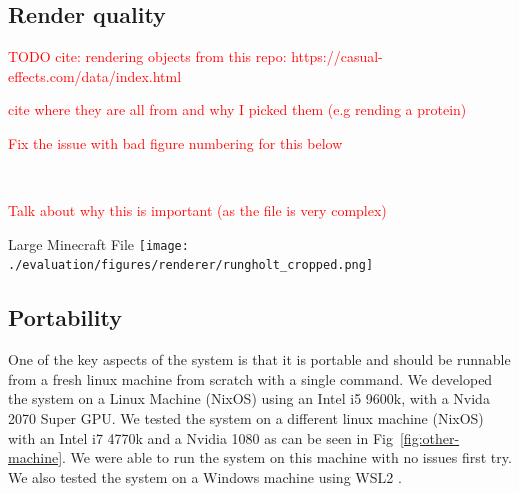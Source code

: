 \subsection[short]{Render quality}
\textcolor{red}{TODO cite: rendering objects from this repo: https://casual-effects.com/data/index.html}


\textcolor{red}{cite where they are all from and why I picked them (e.g rending a protein)}

\textcolor{red}{Fix the issue with bad figure numbering for this below}
\begin{invisBox}  
	\hfill
	\\[0.3cm]
	\hfill
\end{invisBox}

\textcolor{red}{Talk about why this is important (as the file is very complex)}

\begin{figureBox}[label={fig:rungholt}, width=1.0\linewidth]{Large Minecraft File}
	\texttt{[image: ./evaluation/figures/renderer/rungholt\_cropped.png]}
\end{figureBox}


\subsection{Portability}
One of the key aspects of the system is that it is portable and should be runnable from a fresh linux machine from scratch with a single command. We developed the system on a Linux Machine (NixOS) using an Intel i5 9600k, with a Nvida 2070 Super GPU. We tested the system on a different linux machine (NixOS) with an Intel i7 4770k and a Nvidia 1080 as can be seen in Fig~\ref{fig:other-machine}. We were able to run the system on this machine with no issues first try. We also tested the system on a Windows machine using WSL2 \todo. 

